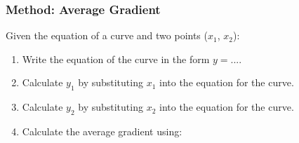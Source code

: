             \subsubsection{ Method: Average Gradient}
            \nopagebreak
        \label{m39223*id190691}Given the equation of a curve and two points (${x}_{1}$, \begin{math}{x}_{2}\end{math}):\par 
        \label{m39223*id190722}\begin{enumerate}[noitemsep, label=\textbf{\arabic*}. ] 
            \label{m39223*uid5}\item Write the equation of the curve in the form $y=...$.
\label{m39223*uid6}\item Calculate ${y}_{1}$ by substituting \begin{math}{x}_{1}\end{math} into the equation for the curve.
\label{m39223*uid7}\item Calculate ${y}_{2}$ by substituting \begin{math}{x}_{2}\end{math} into the equation for the curve.
\label{m39223*uid8}\item Calculate the average gradient using:
\label{m39223*id189188}\nopagebreak\noindent{}
    \end{enumerate}
